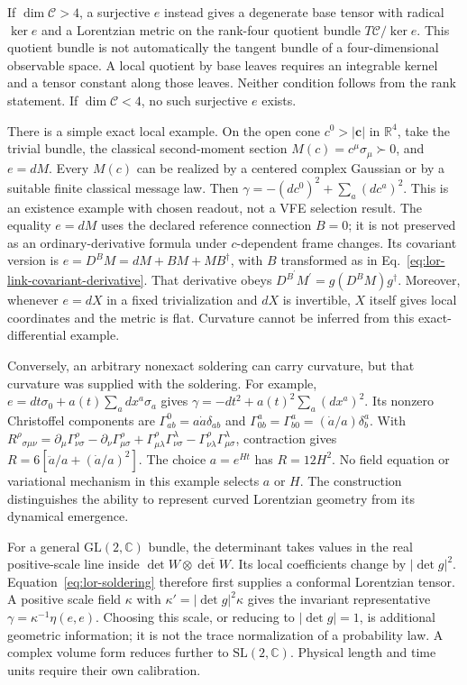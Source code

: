 If $\dim\mathcal C>4$, a surjective $e$ instead gives a degenerate base tensor with radical $\ker e$ and a Lorentzian metric on the rank-four quotient bundle $T\mathcal C/\ker e$. This quotient bundle is not automatically the tangent bundle of a four-dimensional observable space. A local quotient by base leaves requires an integrable kernel and a tensor constant along those leaves. Neither condition follows from the rank statement. If $\dim\mathcal C<4$, no such surjective $e$ exists.

There is a simple exact local example. On the open cone $c^0>|\boldsymbol c|$ in $\mathbb R^4$, take the trivial bundle, the classical second-moment section $M(c)=c^\mu\sigma_\mu\succ0$, and $e=dM$. Every $M(c)$ can be realized by a centered complex Gaussian or by a suitable finite classical message law. Then $\gamma=-(dc^0)^2+\sum_a(dc^a)^2$. This is an existence example with chosen readout, not a VFE selection result. The equality $e=dM$ uses the declared reference connection $B=0$; it is not preserved as an ordinary-derivative formula under $c$-dependent frame changes. Its covariant version is $e=D^BM=dM+BM+MB^\dagger$, with $B$ transformed as in Eq.~\eqref{eq:lor-link-covariant-derivative}. That derivative obeys $D^{B^{\prime}}M^{\prime}=g(D^BM)g^\dagger$. Moreover, whenever $e=dX$ in a fixed trivialization and $dX$ is invertible, $X$ itself gives local coordinates and the metric is flat. Curvature cannot be inferred from this exact-differential example.

Conversely, an arbitrary nonexact soldering can carry curvature, but that curvature was supplied with the soldering. For example, $e=dt\sigma_0+a(t)\sum_a dx^a\sigma_a$ gives $\gamma=-dt^2+a(t)^2\sum_a(dx^a)^2$. Its nonzero Christoffel components are $\Gamma^0_{ab}=a\dot a\delta_{ab}$ and $\Gamma^a_{0b}=\Gamma^a_{b0}=(\dot a/a)\delta^a_b$. With $R^\rho{}_{\sigma\mu\nu}=\partial_\mu\Gamma^\rho_{\nu\sigma}-\partial_\nu\Gamma^\rho_{\mu\sigma}+\Gamma^\rho_{\mu\lambda}\Gamma^\lambda_{\nu\sigma}-\Gamma^\rho_{\nu\lambda}\Gamma^\lambda_{\mu\sigma}$, contraction gives $R=6[\ddot a/a+(\dot a/a)^2]$. The choice $a=e^{Ht}$ has $R=12H^2$. No field equation or variational mechanism in this example selects $a$ or $H$. The construction distinguishes the ability to represent curved Lorentzian geometry from its dynamical emergence.

For a general $\mathrm{GL}(2,\mathbb C)$ bundle, the determinant takes values in the real positive-scale line inside $\det W\otimes\overline{\det W}$. Its local coefficients change by $|\det g|^2$. Equation~\eqref{eq:lor-soldering} therefore first supplies a conformal Lorentzian tensor. A positive scale field $\kappa$ with $\kappa'=|\det g|^2\kappa$ gives the invariant representative $\gamma=\kappa^{-1}\eta(e,e)$. Choosing this scale, or reducing to $|\det g|=1$, is additional geometric information; it is not the trace normalization of a probability law. A complex volume form reduces further to $\mathrm{SL}(2,\mathbb C)$. Physical length and time units require their own calibration.

